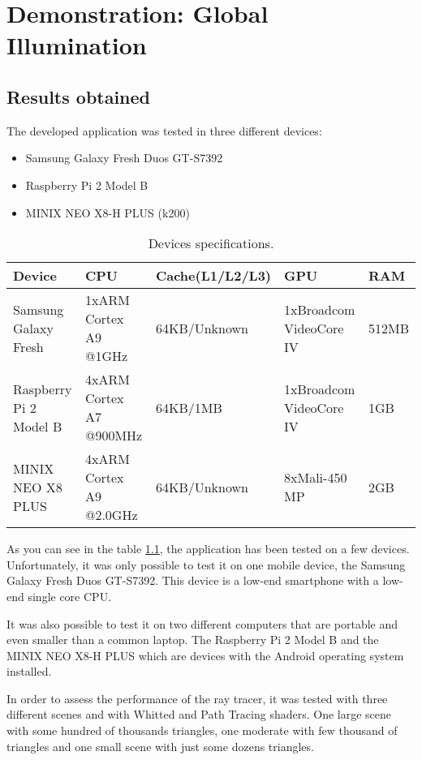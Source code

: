 \chapter{Demonstration: Global Illumination}

\section{Results obtained}
\label{ResultsObtained}

\par
The developed application was tested in three different devices:

\begin{itemize}
	\item Samsung Galaxy Fresh Duos GT-S7392
	\item Raspberry Pi 2 Model B
	\item MINIX NEO X8-H PLUS (k200)
\end{itemize}

\begin{table}[H]
	\small
	\centering
	\caption{Devices specifications.}
	\label{specs}
	\hspace*{-2cm}
	\begin{tabular}{|l|l|l|l|l|}
		\hline
		Device&CPU&Cache(L1/L2/L3)&GPU&RAM\\ \hline
		Samsung Galaxy Fresh&1xARM Cortex A9 @1GHz&64KB/Unknown&1xBroadcom VideoCore IV&512MB\\ \hline
		Raspberry Pi 2 Model B&4xARM Cortex A7 @900MHz&64KB/1MB&1xBroadcom VideoCore IV&1GB\\ \hline
		MINIX NEO X8 PLUS&4xARM Cortex A9 @2.0GHz&64KB/Unknown&8xMali-450 MP&2GB\\ \hline
	\end{tabular}
\end{table}

\par
As you can see in the table \ref{specs}, the application has been tested on a few devices.
Unfortunately, it was only possible to test it on one mobile device, the Samsung Galaxy Fresh Duos GT-S7392.
This device is a low-end smartphone with a low-end single core CPU.

\par
It was also possible to test it on two different computers that are portable and even smaller than a common laptop.
The Raspberry Pi 2 Model B and the MINIX NEO X8-H PLUS which are devices with the Android operating system installed.

\par
In order to assess the performance of the ray tracer, it was tested with three different scenes and with Whitted and Path Tracing shaders.
One large scene with some hundred of thousands triangles, one moderate with few thousand of triangles and one small scene with just some dozens triangles.

